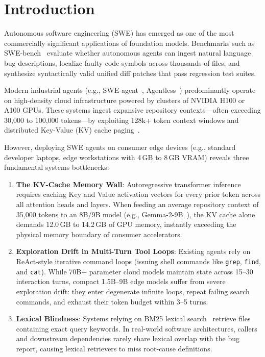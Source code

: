 \documentclass{article}
\begin{document}
\printAffiliationsAndNotice{}

\section{Introduction}
\label{sec:intro}

Autonomous software engineering (SWE) has emerged as one of the most commercially significant applications of foundation models. Benchmarks such as SWE-bench~\cite{jimenez2024swebench} evaluate whether autonomous agents can ingest natural language bug descriptions, localize faulty code symbols across thousands of files, and synthesize syntactically valid unified diff patches that pass regression test suites.

Modern industrial agents (e.g., SWE-agent~\cite{yang2024sweagent}, Agentless~\cite{xia2024agentless}) predominantly operate on high-density cloud infrastructure powered by clusters of NVIDIA H100 or A100 GPUs. These systems ingest expansive repository contexts---often exceeding 30,000 to 100,000 tokens---by exploiting 128k+ token context windows and distributed Key-Value (KV) cache paging~\cite{kwon2023vllm}.

However, deploying SWE agents on consumer edge devices (e.g., standard developer laptops, edge workstations with 4\,GB to 8\,GB VRAM) reveals three fundamental systems bottlenecks:
\begin{enumerate}
    \item \textbf{The KV-Cache Memory Wall}: Autoregressive transformer inference requires caching Key and Value activation vectors for every prior token across all attention heads and layers. When feeding an average repository context of 35,000 tokens to an 8B/9B model (e.g., Gemma-2-9B~\cite{gemmateam2024gemma2}), the KV cache alone demands 12.0\,GB to 14.2\,GB of GPU memory, instantly exceeding the physical memory boundary of consumer accelerators.
    \item \textbf{Exploration Drift in Multi-Turn Tool Loops}: Existing agents rely on ReAct-style iterative command loops (issuing shell commands like \texttt{grep}, \texttt{find}, and \texttt{cat}). While 70B+ parameter cloud models maintain state across 15--30 interaction turns, compact 1.5B--9B edge models suffer from severe exploration drift: they enter degenerate infinite loops, repeat failing search commands, and exhaust their token budget within 3--5 turns.
    \item \textbf{Lexical Blindness}: Systems relying on BM25 lexical search~\cite{xia2024agentless} retrieve files containing exact query keywords. In real-world software architectures, callers and downstream dependencies rarely share lexical overlap with the bug report, causing lexical retrievers to miss root-cause definitions.
\end{enumerate}
\end{document}
